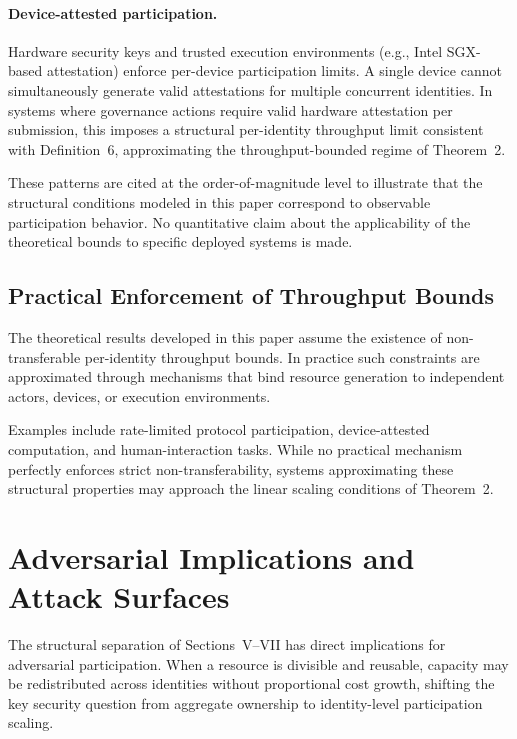 \documentclass[journal]{IEEEtran}
\begin{document}
	\paragraph{Device-attested participation.}
	Hardware security keys and trusted execution environments
	(e.g., Intel SGX-based attestation) enforce per-device
	participation limits.
	A single device cannot simultaneously generate valid
	attestations for multiple concurrent identities.
	In systems where governance actions require valid
	hardware attestation per submission, this imposes a
	structural per-identity throughput limit consistent
	with Definition~6, approximating the throughput-bounded
	regime of Theorem~2.
	
	These patterns are cited at the order-of-magnitude level
	to illustrate that the structural conditions modeled in
	this paper correspond to observable participation behavior.
	No quantitative claim about the applicability of the
	theoretical bounds to specific deployed systems is made.
	
	\subsection{Practical Enforcement of Throughput Bounds}
	
	The theoretical results developed in this paper assume the
	existence of non-transferable per-identity throughput bounds.
	In practice such constraints are approximated through
	mechanisms that bind resource generation to independent
	actors, devices, or execution environments.
	
	Examples include rate-limited protocol participation,
	device-attested computation, and human-interaction tasks.
	While no practical mechanism perfectly enforces strict
	non-transferability, systems approximating these structural properties
	may approach the linear scaling conditions of Theorem~2.
	
	\section{Adversarial Implications and Attack Surfaces}
	
	The structural separation of Sections~V--VII has direct
	implications for adversarial participation.
	When a resource is divisible and reusable, capacity may be
	redistributed across identities without proportional cost growth,
	shifting the key security question from aggregate ownership
	to identity-level participation scaling.
	
\end{document}
